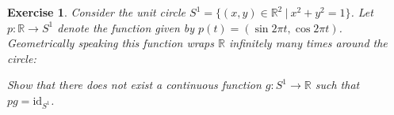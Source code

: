 \documentclass[11pt, letterpaper, oneside]{report}
\theoremstyle{pplain}
\newtheorem{ITERMVALUE THM}[theorem]{Intermediate Value Theorem}
\newtheorem{HEINEBOREL THM}[theorem]{Heine-Borel Theorem}
\newtheorem{UMETR THM}[theorem]{Urysohn Metrization Theorem}
\newtheorem{UMETR2 THM}[theorem]{Urysohn Metrization Theorem (v.2)}
\theoremstyle{ddefinition}
\theoremstyle{nnn}
\newtheorem{TDA NN}[theorem]{Topological Data Analysis. }
\theoremstyle{eexercise}
\newtheorem{exercise}{Exercise}[chapter]
\newcommand{\R}{{\mathbb R}}
\newcommand{\id}{\mathrm{id}}
\begin{document}
\begin{exercise}
Consider the unit circle $S^{1} = \{ (x, y)\in \R^{2} \  | \  x^{2} + y^{2} = 1\}$. 
Let $p\colon \R\to S^{1}$ denote the function 
given by  $p(t) = (\sin 2\pi t, \cos 2\pi  t)$. 
Geometrically speaking this function wraps $\R$ infinitely many times  around the circle:


Show that there does not exist 
a continuous function $g\colon S^{1} \to \R$ such that $pg = \id_{S^{1}}$. 
\end{exercise}
\end{document}
